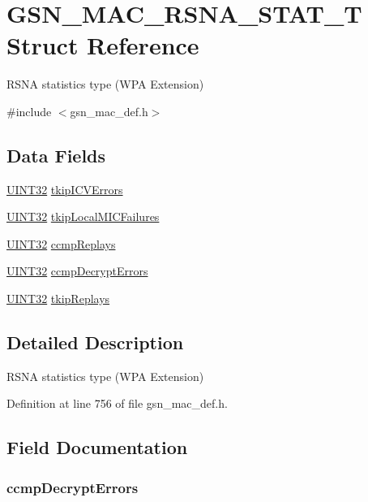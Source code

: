 \hypertarget{a00129}{
\section{GSN\_\-MAC\_\-RSNA\_\-STAT\_\-T Struct Reference}
\label{a00129}
}


RSNA statistics type (WPA Extension)  




{\ttfamily \#include $<$gsn\_\-mac\_\-def.h$>$}

\subsection*{Data Fields}
\begin{DoxyCompactItemize}
\item 
\hyperlink{a00660_gae1e6edbbc26d6fbc71a90190d0266018}{UINT32} \hyperlink{a00129_ab0cd1d012826ecea07fc98338dcf659b}{tkipICVErrors}
\item 
\hyperlink{a00660_gae1e6edbbc26d6fbc71a90190d0266018}{UINT32} \hyperlink{a00129_a89e64fc1c041a15d2c07729f9a9e839f}{tkipLocalMICFailures}
\item 
\hyperlink{a00660_gae1e6edbbc26d6fbc71a90190d0266018}{UINT32} \hyperlink{a00129_a57a6c57244417c6aedf9f7a685faf3fe}{ccmpReplays}
\item 
\hyperlink{a00660_gae1e6edbbc26d6fbc71a90190d0266018}{UINT32} \hyperlink{a00129_aac62fe9a28a83a13557f7f3b62b73559}{ccmpDecryptErrors}
\item 
\hyperlink{a00660_gae1e6edbbc26d6fbc71a90190d0266018}{UINT32} \hyperlink{a00129_ae7f0fd49eb4fdd75d7ab51c0493d0ffb}{tkipReplays}
\end{DoxyCompactItemize}


\subsection{Detailed Description}
RSNA statistics type (WPA Extension) 

Definition at line 756 of file gsn\_\-mac\_\-def.h.



\subsection{Field Documentation}
\hypertarget{a00129_aac62fe9a28a83a13557f7f3b62b73559}{
\subsubsection[{ccmpDecryptErrors}]{ {\bf ccmpDecryptErrors}}}
\label{a00129_aac62fe9a28a83a13557f7f3b62b73559}


